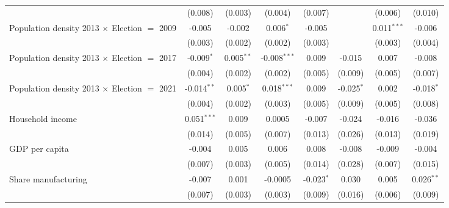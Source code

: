 \begin{table}[htbp]
\begin{tabular}{lccccccc}
                                                              & (0.008)       & (0.003)      & (0.004)        & (0.007)       &                & (0.006)        & (0.010)\\   
      Population density 2013 $\times$ Election $=$ 2009      & -0.005        & -0.002       & 0.006$^{*}$    & -0.005        &                & 0.011$^{***}$  & -0.006\\   
                                                              & (0.003)       & (0.002)      & (0.002)        & (0.003)       &                & (0.003)        & (0.004)\\   
      Population density 2013 $\times$ Election $=$ 2017      & -0.009$^{*}$  & 0.005$^{**}$ & -0.008$^{***}$ & 0.009         & -0.015         & 0.007          & -0.008\\   
                                                              & (0.004)       & (0.002)      & (0.002)        & (0.005)       & (0.009)        & (0.005)        & (0.007)\\   
      Population density 2013 $\times$ Election $=$ 2021      & -0.014$^{**}$ & 0.005$^{*}$  & 0.018$^{***}$  & 0.009         & -0.025$^{*}$   & 0.002          & -0.018$^{*}$\\   
                                                              & (0.004)       & (0.002)      & (0.003)        & (0.005)       & (0.009)        & (0.005)        & (0.008)\\   
      Household income                                        & 0.051$^{***}$ & 0.009        & 0.0005         & -0.007        & -0.024         & -0.016         & -0.036\\   
                                                              & (0.014)       & (0.005)      & (0.007)        & (0.013)       & (0.026)        & (0.013)        & (0.019)\\   
      GDP per capita                                          & -0.004        & 0.005        & 0.006          & 0.008         & -0.008         & -0.009         & -0.004\\   
                                                              & (0.007)       & (0.003)      & (0.005)        & (0.014)       & (0.028)        & (0.007)        & (0.015)\\   
      Share manufacturing                                     & -0.007        & 0.001        & -0.0005        & -0.023$^{*}$  & 0.030          & 0.005          & 0.026$^{**}$\\   
                                                              & (0.007)       & (0.003)      & (0.003)        & (0.009)       & (0.016)        & (0.006)        & (0.009)\\   

\end{tabular}
\end{table}
